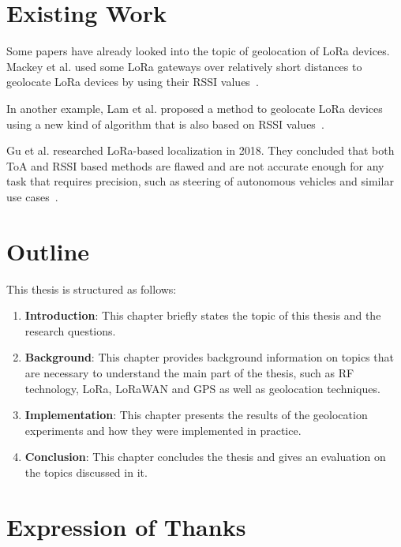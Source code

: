 \section{Existing Work}

Some papers have already looked into the topic of geolocation of \ac{LoRa} devices.
Mackey et al. used some \ac{LoRa} gateways over relatively short distances to geolocate \ac{LoRa} devices by using their \ac{RSSI} values~\cite{mackey_lora-based_2019}.

In another example, Lam et al. proposed a method to geolocate \ac{LoRa} devices using a new kind of algorithm that is also based on \ac{RSSI} values~\cite{lam_new_2018}.

Gu et al. researched \ac{LoRa}-based localization in 2018.
They concluded that both \ac{ToA} and \ac{RSSI} based methods are flawed and are not accurate enough for any task that requires precision, such as steering of autonomous vehicles and similar use cases~\cite{gu_lora-based_2018}.

\section{Outline}

This thesis is structured as follows:

\begin{enumerate}
      \item \textbf{Introduction}:
            This chapter briefly states the topic of this thesis and the research questions.
      \item \textbf{Background}:
            This chapter provides background information on topics that are necessary to understand the main part of the thesis, such as \ac{RF} technology, \ac{LoRa}, \ac{LoRaWAN} and \ac{GPS} as well as geolocation techniques.
      \item \textbf{Implementation}:
            This chapter presents the results of the geolocation experiments and how they were implemented in practice.
      \item \textbf{Conclusion}:
            This chapter concludes the thesis and gives an evaluation on the topics discussed in it.
\end{enumerate}


\section{Expression of Thanks}

